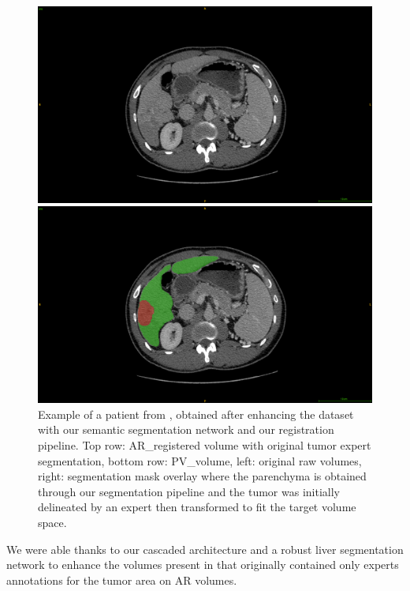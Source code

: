 \begin{figure}[ht!]
\vspace{0.8cm}
\begin{minipage}{0.45\linewidth}
\includegraphics[width=0.9\linewidth]{./images/GDB/GDB_Pat77_slice261_raw_PV}
\end{minipage}
\hspace{0.3cm}
\begin{minipage}{0.45\linewidth}
\includegraphics[width=0.9\linewidth]{./images/GDB/GDB_Pat77_slice261_PV_liverTumorPred}
\end{minipage}
\caption{Example of a patient from , obtained after enhancing the dataset with our semantic segmentation network and our registration pipeline. Top row: AR\_registered volume with original tumor expert segmentation, bottom row: PV\_volume, left: original raw volumes, right: segmentation mask overlay where the parenchyma is obtained through our segmentation pipeline and the tumor was initially delineated by an expert then transformed to fit the target volume space.}
\label{fig:gDbRegisteredPatient}
\end{figure}


We were able thanks to our cascaded architecture and a robust liver
segmentation network to enhance the volumes present in  that
originally contained only experts annotations for the tumor area on AR volumes.

